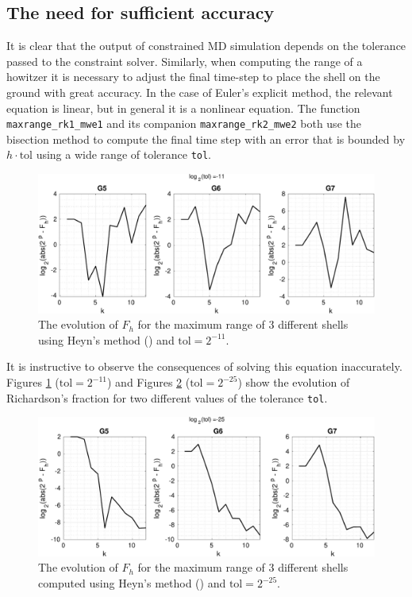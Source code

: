 \documentclass[runningheads]{llncs}
\begin{document}
\subsection{The need for sufficient accuracy}

It is clear that the output of constrained MD simulation depends on the tolerance passed to the constraint solver. Similarly, when computing the range of a howitzer it is necessary to adjust the final time-step to place the shell on the ground with great accuracy. In the case of Euler's explicit method, the relevant equation is linear, but in general it is a nonlinear equation. The function {\tt maxrange\_rk1\_mwe1} and its companion {\tt maxrange\_rk2\_mwe2} both use the bisection method to compute the final time step with an error that is bounded by $h\cdot\text{tol}$ using a wide range of tolerance {\tt tol}.
\begin{figure}
  \includegraphics[width=\linewidth]{maxrange_rk2_tol11.pdf} \caption{The evolution of $F_h$ for the maximum range of 3 different shells using Heyn's method () and $\text{tol} = 2^{-11}$.}
  \label{fig:maxrange_rk2_tol11}
\end{figure}
It is instructive to observe the consequences of solving this equation inaccurately. Figures \ref{fig:maxrange_rk2_tol11} ($\text{tol} = 2^{-11}$) and Figures \ref{fig:maxrange_rk2_tol25} ($\text{tol} = 2^{-25}$) show the evolution of Richardson's fraction for two different values of the tolerance {\tt tol}.
\begin{figure}
  \includegraphics[width=\linewidth]{maxrange_rk2_tol25.pdf} \caption{The evolution of $F_h$ for the maximum range of 3 different shells computed using Heyn's method () and $\text{tol} = 2^{-25}$.}
  \label{fig:maxrange_rk2_tol25}
\end{figure}
\end{document}
